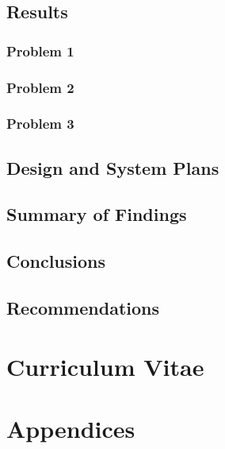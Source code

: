 \documentclass{research}
\begin{document}
\section{Results}

\subsection{Problem 1}

\subsection{Problem 2}

\subsection{Problem 3}

\section{Design and System Plans}

\section{Summary of Findings}

\section{Conclusions}

\section{Recommendations}


\clearpage

\printbibliography

\clearpage

\chapter*{Curriculum Vitae}

\chapter*{Appendices}
\end{document}
